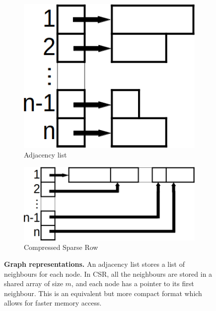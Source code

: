 \begin{figure}[h]
    \centering 
    \begin{subfigure}{0.25\textwidth}
        \includegraphics[width=\linewidth]{img/format-adjlist.png}
        \caption{Adjacency list}\label{img-format-adjlist}
    \end{subfigure}\hspace{0.05\textwidth}
    \begin{subfigure}{0.5\textwidth}
        \includegraphics[width=\linewidth]{img/format-csr.png}
        \caption{Compressed Sparse Row}\label{img-format-crf}
    \end{subfigure}
    \caption{\textbf{Graph representations.} An adjacency list stores a list of neighbours for each node. In CSR, all the neighbours are stored in a shared array of size $m$, and each node has a pointer to its first neighbour. This is an equivalent but more compact format which allows for faster memory access. }\label{img-format}
\end{figure}



